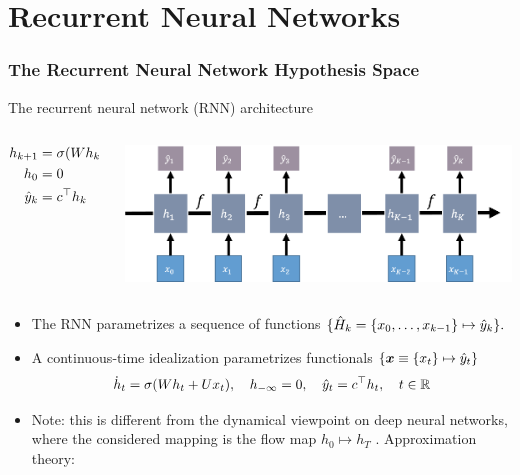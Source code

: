 \section{Recurrent Neural Networks}


\begin{frame}
	\frametitle{The Recurrent Neural Network Hypothesis Space}
	The \alert{recurrent neural network (RNN)} architecture
	\begin{columns}
		\begin{column}[T, onlytextwidth]{.45\textwidth}%
		\setlength{\partopsep}{0pt}%
		\begin{equation*}
			\begin{aligned}
			h_{k+1} &= \sigma(Wh_{k} + Ux_{k}),
			\qquad h_k \in \mathbb{R}^m
			\\
			h_0 &= 0
			\\
			\hat{y}_k &= c^\top h_{k}
			\end{aligned}
		\end{equation*}
		\end{column}%
		\begin{column}[T]{.45\textwidth}
		\includegraphics[width=\textwidth]{figures/recurrent_structure.png}
		\end{column}%
	\end{columns}

	\vspace{.5cm}

	\pause{}


    \begin{itemize}[<+->]
        \item
        The RNN parametrizes a sequence of functions
        $
            \{
            \hat{H}_k
            =
            \{x_0,\dots,x_{k-1}\} \mapsto \hat{y}_k
            \}.
        $
        \item
        A continuous-time idealization parametrizes functionals
        $\{ \boldsymbol{x} \equiv \{x_t\} \mapsto \hat{y}_t \}$
        \begin{equation*}
            \dot{h}_t = \sigma(Wh_t + Ux_t),
            \quad h_{-\infty} = 0,
            \quad \hat{y}_t = c^\top h_t,
            \quad t \in \mathbb{R}
        \end{equation*}
        \item
        Note: this is different from the dynamical viewpoint on deep neural networks,
        where the considered mapping is the flow map $h_0 \mapsto h_T$ .
        Approximation theory: 


\end{itemize}
\end{frame}
